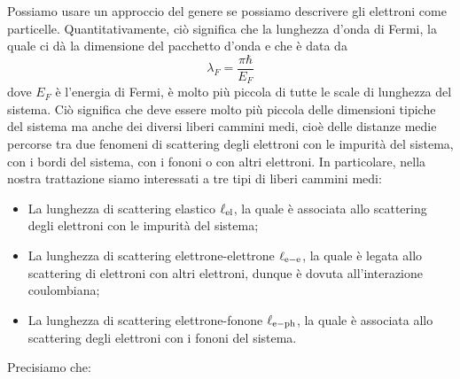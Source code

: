 Possiamo usare un approccio del genere se possiamo descrivere gli elettroni come particelle. Quantitativamente, ciò significa che la lunghezza d'onda di Fermi, la quale ci dà la dimensione del pacchetto d'onda e che è data da
\begin{equation*}
    \lambda_F=\frac{\pi \hbar}{E_F}
\end{equation*}
dove $E_F$ è l'energia di Fermi, è molto più piccola di tutte le scale di lunghezza del sistema. Ciò significa che deve essere molto più piccola delle dimensioni tipiche del sistema ma anche dei diversi liberi cammini medi, cioè delle distanze medie percorse tra due fenomeni di scattering degli elettroni con le impurità del sistema, con i bordi del sistema, con i fononi o con altri elettroni. In particolare, nella nostra trattazione siamo interessati a tre tipi di liberi cammini medi:
\begin{itemize}[leftmargin=0.5cm]
    \item La lunghezza di scattering elastico $\ell_{\rm el}$, la quale è associata allo scattering degli elettroni con le impurità del sistema;
    \item La lunghezza di scattering elettrone-elettrone $\ell_{\rm e-e}$, la quale è legata allo scattering di elettroni con altri elettroni, dunque è dovuta all'interazione coulombiana;
    \item La lunghezza di scattering elettrone-fonone $\ell_{\rm e-ph}$, la quale è associata allo scattering degli elettroni con i fononi del sistema.
\end{itemize}
Precisiamo che:
